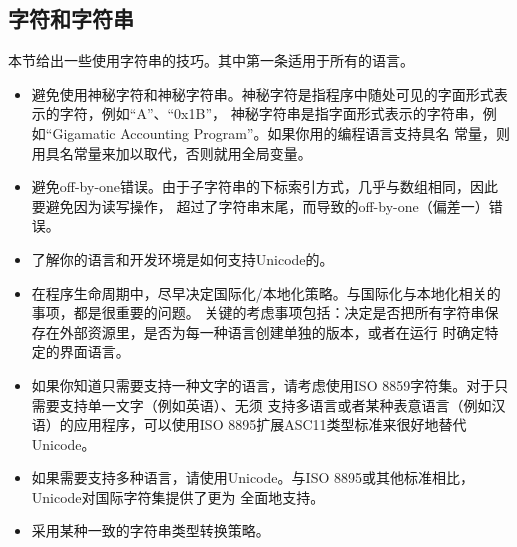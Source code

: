 \documentclass{article}
\begin{document}
\subsection{字符和字符串}
本节给出一些使用字符串的技巧。其中第一条适用于所有的语言。
\begin{itemize}
    \item 避免使用神秘字符和神秘字符串。神秘字符是指程序中随处可见的字面形式表示的字符，例如“A”、“0x1B”，
    神秘字符串是指字面形式表示的字符串，例如“Gigamatic Accounting Program”。如果你用的编程语言支持具名
    常量，则用具名常量来加以取代，否则就用全局变量。
    \item 避免off-by-one错误。由于子字符串的下标索引方式，几乎与数组相同，因此要避免因为读写操作，
    超过了字符串末尾，而导致的off-by-one（偏差一）错误。
    \item 了解你的语言和开发环境是如何支持Unicode的。
    \item 在程序生命周期中，尽早决定国际化/本地化策略。与国际化与本地化相关的事项，都是很重要的问题。
    关键的考虑事项包括：决定是否把所有字符串保存在外部资源里，是否为每一种语言创建单独的版本，或者在运行
    时确定特定的界面语言。
    \item 如果你知道只需要支持一种文字的语言，请考虑使用ISO 8859字符集。对于只需要支持单一文字（例如英语）、无须
    支持多语言或者某种表意语言（例如汉语）的应用程序，可以使用ISO 8895扩展ASC11类型标准来很好地替代Unicode。
    \item 如果需要支持多种语言，请使用Unicode。与ISO 8895或其他标准相比，Unicode对国际字符集提供了更为
    全面地支持。
    \item 采用某种一致的字符串类型转换策略。
\end{itemize}
\end{document}
